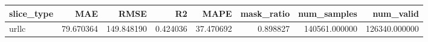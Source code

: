 \begin{tabular}{lrrrrrrr}
\toprule
slice_type & MAE & RMSE & R2 & MAPE & mask_ratio & num_samples & num_valid \\
\midrule
urllc & 79.670364 & 149.848190 & 0.424036 & 37.470692 & 0.898827 & 140561.000000 & 126340.000000 \\
\bottomrule
\end{tabular}
